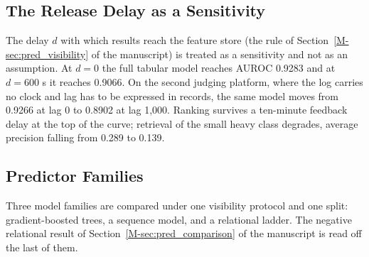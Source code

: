 \documentclass[mathematics,supfile,submit,moreauthors]{Definitions/mdpi}
\newcommand{\devnum}[1]{#1}
\begin{document}

\subsection{The Release Delay as a Sensitivity}
\label{sec:supp_lag}

The delay $d$ with which results reach the feature store (the rule of
Section~\ref*{M-sec:pred_visibility} of the manuscript) is treated as a sensitivity and not as
an assumption. At $d = 0$ the full tabular model reaches
AUROC \devnum{0.9283} and at $d = \devnum{600}$ s it reaches \devnum{0.9066}. On the second judging
platform, where the log carries no clock and lag has to be expressed in records, the same
model moves from \devnum{0.9266} at lag \devnum{0} to \devnum{0.8902} at lag
\devnum{1{,}000}. Ranking survives a ten-minute feedback delay at the top of the
curve; retrieval of the small heavy class degrades, average precision falling from
\devnum{0.289} to \devnum{0.139}.


\subsection{Predictor Families}
\label{sec:supp_families}

Three model families are compared under one visibility protocol and one split: gradient-boosted
trees, a sequence model, and a relational ladder. The negative relational result of
Section~\ref*{M-sec:pred_comparison} of the manuscript is read off the last of them.
\end{document}
